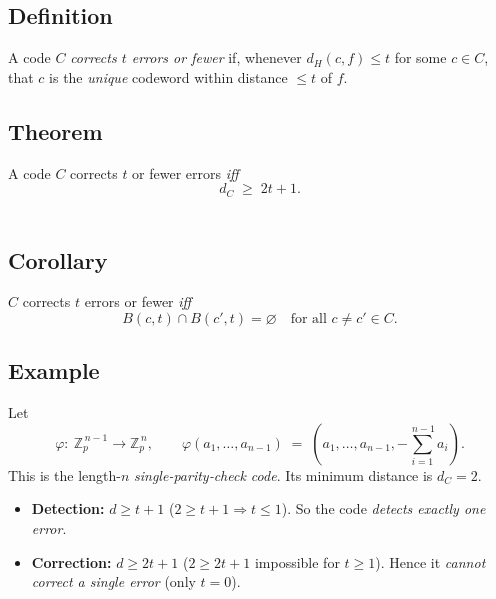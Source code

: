 \documentclass[docmute]{article}
\begin{document}
\bigskip
\subsection*{Definition}
A code $C$ \textit{corrects $t$ errors or fewer} if, whenever
$d_H(c,f)\le t$ for some $c\in C$, that $c$ is the \emph{unique} codeword
within distance $\le t$ of $f$.\\[10pt]

\subsection*{Theorem}
A code $C$ corrects $t$ or fewer errors \emph{iff}
\[
  d_C \;\ge\; 2t+1.
\]\\[6pt]

\subsection*{Corollary}
$C$ corrects $t$ errors or fewer \emph{iff}
\[
  B(c,t)\cap B(c',t)=\varnothing
  \quad\text{for all } c\neq c'\in C.
\]

\begin{center}
\end{center}

\subsection*{Example}
Let
\[
  \varphi:\ \mathbb Z_p^{\,n-1}\longrightarrow \mathbb Z_p^{\,n},
  \qquad
  \varphi(a_1,\dots,a_{n-1}) \;=\;
  (a_1,\dots,a_{n-1}, -\sum_{i=1}^{\,n-1}a_i).
\]
This is the length-$n$ \emph{single‐parity‐check code}.  
Its minimum distance is $d_C=2$.

\begin{itemize}
  \item \textbf{Detection:} $d\ge t+1$ \;($2\ge t+1\Rightarrow t\le1$).  
        So the code \emph{detects exactly one error}.
  \item \textbf{Correction:} $d\ge 2t+1$ \;($2\ge 2t+1$ impossible for
        $t\ge1$).  Hence it \emph{cannot correct a single error}
        (only $t=0$).
\end{itemize}
\end{document}
